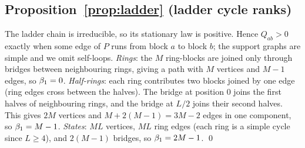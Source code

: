 \subsection{Proposition~\ref{prop:ladder} (ladder cycle ranks)}

The ladder chain is irreducible, so its stationary law is positive. Hence \(Q_{ab}>0\) exactly when some edge of \(P\) runs from block \(a\) to block \(b\); the support graphs are simple and we omit self-loops. \emph{Rings}: the \(M\) ring-blocks are joined only through bridges between neighbouring rings, giving a path with \(M\) vertices and \(M-1\) edges, so \(\beta_1=0\). \emph{Half-rings}: each ring contributes two blocks joined by one edge (ring edges cross between the halves). The bridge at position \(0\) joins the first halves of neighbouring rings, and the bridge at \(L/2\) joins their second halves. This gives \(2M\) vertices and \(M+2(M-1)=3M-2\) edges in one component, so \(\beta_1=M-1\). \emph{States}: \(ML\) vertices, \(ML\) ring edges (each ring is a simple cycle since \(L\ge4\)), and \(2(M-1)\) bridges, so \(\beta_1=2M-1\). \qed
